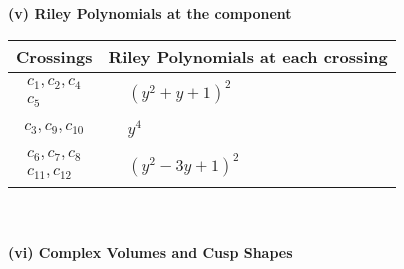 \documentclass[1p]{elsarticle_modified}
\theoremstyle{definition}
\begin{document}
\newpage\renewcommand{\arraystretch}{1}
\flushleft \textbf{(v) Riley Polynomials at the component}\newline \\
\begin{tabular}{m{50pt}|m{274pt}}
Crossings & \hspace{64pt}Riley Polynomials at each crossing \\
\hline $$\begin{aligned}c_{1},c_{2},c_{4}\\c_{5}\end{aligned}$$&$\begin{aligned}
&(y^2+y+1)^2
\end{aligned}$\\
\hline $$\begin{aligned}c_{3},c_{9},c_{10}\end{aligned}$$&$\begin{aligned}
&y^4
\end{aligned}$\\
\hline $$\begin{aligned}c_{6},c_{7},c_{8}\\c_{11},c_{12}\end{aligned}$$&$\begin{aligned}
&(y^2-3 y+1)^2
\end{aligned}$\\
\hline
\end{tabular}\\~\\
\newpage\flushleft \textbf{(vi) Complex Volumes and Cusp Shapes}
\end{document}
